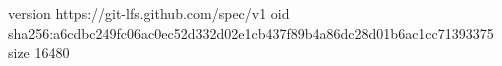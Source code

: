 version https://git-lfs.github.com/spec/v1
oid sha256:a6cdbc249fc06ac0ec52d332d02e1cb437f89b4a86dc28d01b6ac1cc71393375
size 16480
